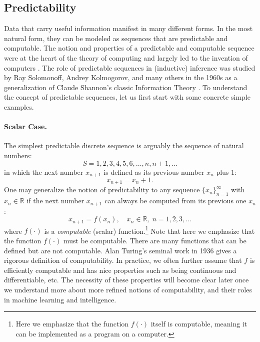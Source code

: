 \documentclass[../../book-main.tex]{subfiles}
\begin{document}
\subsection{Predictability}
\label{sec:predictability}
Data that carry useful information manifest in many different forms. In the most natural form, they can be modeled as sequences that are predictable and computable. The notion and properties of a predictable and computable sequence were at the heart of the theory of computing and largely led to the invention of computers \cite{Turing-1936}. The role of predictable sequences in (inductive) inference was studied by Ray Solomonoff, Andrey Kolmogorov, and many others in the 1960s \cite{Kolmogorov1998OnTO} as a generalization of Claude Shannon's classic Information Theory \cite{Shannon-1948}. To understand the concept of predictable sequences, let us first start with some concrete simple examples. 
\paragraph{Scalar Case.} The simplest predictable discrete sequence is arguably the sequence of natural numbers:
\begin{equation}
   {S} =  1, 2, 3, 4, 5, 6, \ldots, n, n+1, \ldots
\end{equation}
in which the next number $x_{n+1}$ is defined as its previous number $x_n$ plus 1:
\begin{equation}
x_{n+1} = x_n + 1.    
\end{equation}
One may generalize the notion of predictability to any sequence $\{x_n\}_{n=1}^\infty$ with $ x_n \in \mathbb{R}$ if the next number $x_{n+1}$ can always be computed from its previous one $x_n$:
\begin{equation}
    x_{n+1} = f(x_{n}), \quad x_n \in \mathbb{R}, \; n =  1, 2, 3, \ldots
\end{equation}
where $f(\cdot)$ is a {\em computable} (scalar) function.\footnote{Here we emphasize that the function $f(\cdot)$ itself is computable, meaning it can be implemented as a program on a computer. } Note that here we emphasize that the function $f(\cdot)$ must be computable. There are many functions that can be defined but are not computable. Alan Turing's seminal work in 1936 \cite{Turing-1936} gives a rigorous definition of computability. In practice, we often further assume that $f$ is efficiently computable and has nice properties such as being continuous and differentiable, etc. The necessity of these properties will become clear later once we understand more about more refined notions of computability, and their roles in machine learning and intelligence.
\end{document}
